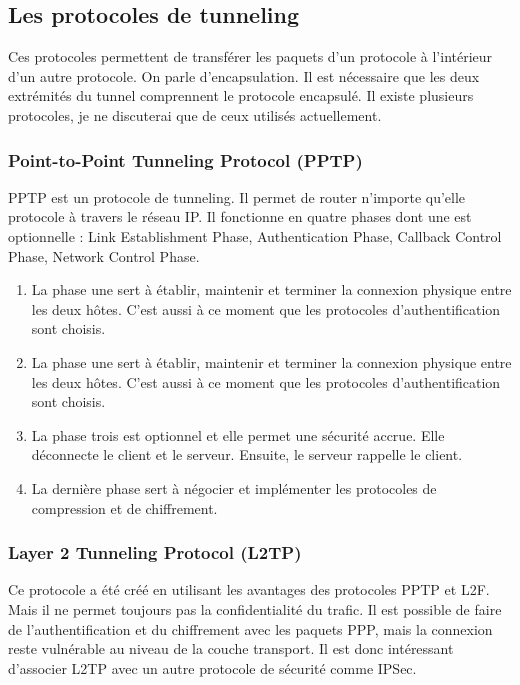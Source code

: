 \subsection{Les protocoles de tunneling}
Ces protocoles permettent de transférer les paquets d'un protocole à l'intérieur d'un autre protocole. 
On parle d'encapsulation.  
Il est nécessaire que les deux extrémités du tunnel comprennent le protocole encapsulé.  
Il existe plusieurs protocoles, je ne discuterai que de ceux utilisés actuellement.
\subsubsection{Point-to-Point Tunneling Protocol (PPTP)}
PPTP est un protocole de tunneling. 
Il permet de router n'importe qu'elle protocole à travers le réseau IP. 
Il fonctionne en quatre phases dont une est optionnelle : Link Establishment Phase, Authentication Phase, Callback Control Phase, Network Control Phase.
\begin{enumerate}
	\item La phase une sert à établir, maintenir et terminer la connexion physique entre les deux hôtes. C'est aussi à ce moment que les protocoles d'authentification sont choisis.
	\item La phase une sert à établir, maintenir et terminer la connexion physique entre les deux hôtes. C'est aussi à ce moment que les protocoles d'authentification sont choisis.
	\item La phase trois est optionnel et elle permet une sécurité accrue. Elle déconnecte le client et le serveur. Ensuite, le serveur rappelle le client. 
	\item La dernière phase sert à négocier et implémenter les protocoles de compression et de chiffrement.
\end{enumerate}
\subsubsection{Layer 2 Tunneling Protocol (L2TP)}
Ce protocole a été créé en utilisant les avantages des protocoles PPTP et L2F. 
Mais il ne permet toujours pas la confidentialité du trafic. 
Il est possible de faire de l'authentification et du chiffrement avec les paquets PPP, mais la connexion reste vulnérable au niveau de la couche transport. 
Il est donc intéressant d'associer L2TP avec un autre protocole de sécurité comme IPSec.